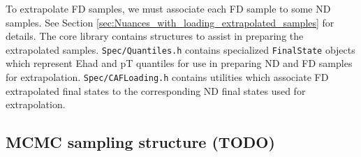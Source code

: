 \documentclass{article}
\begin{document}
To extrapolate FD samples, we must associate each FD sample to some ND samples. See Section \ref{sec:Nuances_with_loading_extrapolated_samples} for details. The core library contains structures to assist in preparing the extrapolated samples. \texttt{Spec/Quantiles.h} contains specialized \texttt{FinalState} objects which represent Ehad and pT quantiles for use in preparing ND and FD samples for extrapolation. \texttt{Spec/CAFLoading.h} contains utilities which associate FD extrapolated final states to the corresponding ND final states used for extrapolation.

\subsection{MCMC sampling structure (TODO)}
\end{document}
